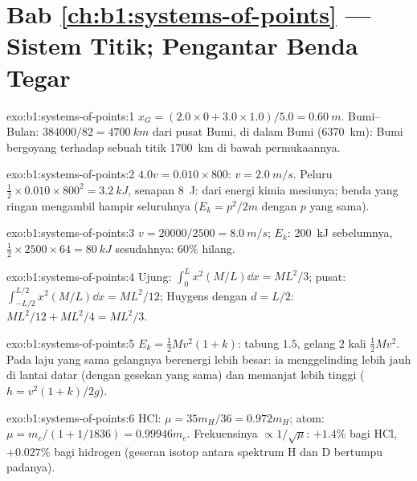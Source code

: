\section*{Bab \ref{ch:b1:systems-of-points} --- Sistem Titik; Pengantar Benda Tegar}

\begin{solution}{exo:b1:systems-of-points:1}
$x_G = (2.0 \times 0 + 3.0 \times 1.0)/5.0 = \qty{0.60}{m}$. Bumi--Bulan:
$384000/82 = \qty{4700}{km}$ dari pusat Bumi, di dalam Bumi
(\qty{6370}{km}): Bumi bergoyang terhadap sebuah titik \qty{1700}{km} di bawah
permukaannya.
\end{solution}

\begin{solution}{exo:b1:systems-of-points:2}
$4.0v = 0.010 \times 800$: $v = \qty{2.0}{m/s}$. Peluru $\tfrac12 \times 0.010
\times 800^2 = \qty{3.2}{kJ}$, senapan \qty{8}{J}: dari energi kimia
mesiunya; benda yang ringan mengambil hampir seluruhnya ($E_k = p^2/2m$
dengan $p$ yang sama).
\end{solution}

\begin{solution}{exo:b1:systems-of-points:3}
$v = 20000/2500 = \qty{8.0}{m/s}$; $E_k$: \qty{200}{kJ} sebelumnya, $\tfrac12 \times
2500 \times 64 = \qty{80}{kJ}$ sesudahnya: $60\%$ hilang.
\end{solution}

\begin{solution}{exo:b1:systems-of-points:4}
Ujung: $\int_0^L x^2(M/L)\dd x = ML^2/3$; pusat: $\int_{-L/2}^{L/2}x^2(M/L)
\dd x = ML^2/12$; Huygens dengan $d = L/2$: $ML^2/12 + ML^2/4 = ML^2/3$.
\end{solution}

\begin{solution}{exo:b1:systems-of-points:5}
$E_k = \tfrac12 Mv^2(1 + k)$: tabung $1.5$, gelang $2$ kali $\tfrac12 Mv^2$.
Pada laju yang sama gelangnya berenergi lebih besar: ia menggelinding lebih jauh di lantai datar
(dengan gesekan yang sama) dan memanjat lebih tinggi ($h = v^2(1 + k)/2g$).
\end{solution}

\begin{solution}{exo:b1:systems-of-points:6}
HCl: $\mu = 35m_H/36 = 0.972m_H$; atom: $\mu = m_e/(1 + 1/1836) =
0.99946m_e$. Frekuensinya $\propto 1/\sqrt\mu$: $+1.4\%$ bagi HCl, $+0.027\%$
bagi hidrogen (geseran isotop antara spektrum H dan D bertumpu padanya).
\end{solution}


